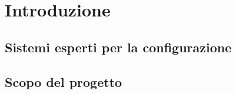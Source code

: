 \section{Introduzione}

\subsection{Sistemi esperti per la configurazione}

\subsection{Scopo del progetto}